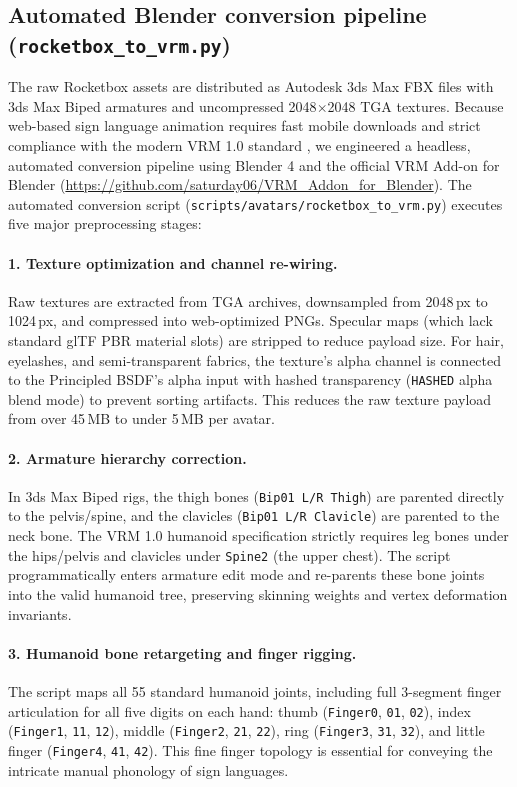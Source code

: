 \subsection{Automated Blender conversion pipeline (\texttt{rocketbox\_to\_vrm.py})}
The raw Rocketbox assets are distributed as Autodesk 3ds Max FBX files with 3ds Max Biped armatures and uncompressed 2048$\times$2048 TGA textures. Because web-based sign language animation requires fast mobile downloads and strict compliance with the modern VRM 1.0 standard \cite{vrm}, we engineered a headless, automated conversion pipeline using Blender 4 and the official VRM Add-on for Blender (\url{https://github.com/saturday06/VRM_Addon_for_Blender}). The automated conversion script (\texttt{scripts/avatars/rocketbox\_to\_vrm.py}) executes five major preprocessing stages:

\paragraph{1. Texture optimization and channel re-wiring.} Raw textures are extracted from TGA archives, downsampled from 2048\,px to 1024\,px, and compressed into web-optimized PNGs. Specular maps (which lack standard glTF PBR material slots) are stripped to reduce payload size. For hair, eyelashes, and semi-transparent fabrics, the texture's alpha channel is connected to the Principled BSDF's alpha input with hashed transparency (\texttt{HASHED} alpha blend mode) to prevent sorting artifacts. This reduces the raw texture payload from over 45\,MB to under 5\,MB per avatar.

\paragraph{2. Armature hierarchy correction.} In 3ds Max Biped rigs, the thigh bones (\texttt{Bip01 L/R Thigh}) are parented directly to the pelvis/spine, and the clavicles (\texttt{Bip01 L/R Clavicle}) are parented to the neck bone. The VRM 1.0 humanoid specification strictly requires leg bones under the hips/pelvis and clavicles under \texttt{Spine2} (the upper chest). The script programmatically enters armature edit mode and re-parents these bone joints into the valid humanoid tree, preserving skinning weights and vertex deformation invariants.

\paragraph{3. Humanoid bone retargeting and finger rigging.} The script maps all 55 standard humanoid joints, including full 3-segment finger articulation for all five digits on each hand: thumb (\texttt{Finger0}, \texttt{01}, \texttt{02}), index (\texttt{Finger1}, \texttt{11}, \texttt{12}), middle (\texttt{Finger2}, \texttt{21}, \texttt{22}), ring (\texttt{Finger3}, \texttt{31}, \texttt{32}), and little finger (\texttt{Finger4}, \texttt{41}, \texttt{42}). This fine finger topology is essential for conveying the intricate manual phonology of sign languages.

